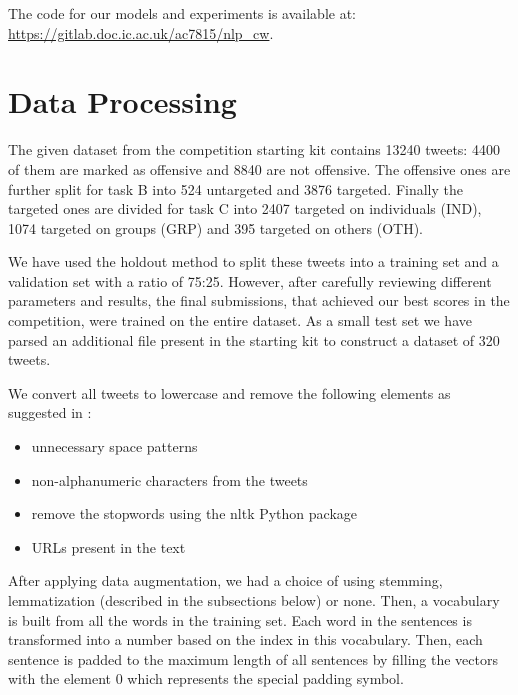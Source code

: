 \documentclass[11pt,a4paper]{article}
\begin{document}
The code for our models and experiments is available at: \url{https://gitlab.doc.ic.ac.uk/ac7815/nlp_cw}.


\section{Data Processing}



The given dataset from the competition starting kit contains 13240 tweets: 4400 of them are marked as offensive and 8840 are not offensive. The offensive ones are further split for task B into 524 untargeted and 3876 targeted. Finally the targeted ones are divided for task C into 2407 targeted on individuals (IND), 1074 targeted on groups (GRP) and 395 targeted on others (OTH).

We have used the holdout method to split these tweets into a training set and a validation set with a ratio of 75:25. However, after carefully reviewing different parameters and results, the final submissions, that achieved our best scores in the competition, were trained on the entire dataset. As a small test set we have parsed an additional file present in the starting kit to construct a dataset of 320 tweets.

We convert all tweets to lowercase and remove the following elements as suggested in \cite{preproc}:
\begin{itemize}
    \item unnecessary space patterns
    \item non-alphanumeric characters from the tweets
    \item remove the stopwords using the nltk Python package
    \item URLs present in the text
\end{itemize}

After applying data augmentation, we had a choice of using stemming, lemmatization (described in the subsections below) or none. Then, a vocabulary is built from all the words in the training set. Each word in the sentences is transformed into a number based on the index in this vocabulary. Then, each sentence is padded to the maximum length of all sentences by filling the vectors with the element 0 which represents the special padding symbol.
\end{document}
